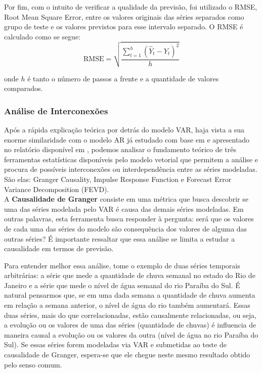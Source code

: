 \documentclass[12pt]{article}
\begin{document}
	Por fim, com o intuito de verificar a qualidade da previsão, foi utilizado o RMSE, \textrm{Root Mean Square Error}, entre os valores originais das séries separados como grupo de teste e os valores previstos para esse intervalo separado. O RMSE é calculado como se segue:
	\begin{equation}\label{eq:RMSE}
		\textrm{RMSE} = \sqrt{\dfrac{\sum_{t=1}^{h}(\hat{Y}_t-Y_t)^2}{h}}
	\end{equation} 
	
	onde $h$ é tanto o número de passos a frente e a quantidade de valores comparados.
	
	\subsubsection{Análise de Interconexões} \label{sec:interconex}
	
	Após a rápida explicação teórica por detrás do modelo VAR, haja vista a sua enorme similaridade com o modelo AR já estudado com base em \cite{Tsay} e apresentado no relatório disponível em \cite{git}, podemos analisar o fundamento teórico de três ferramentas estatísticas disponíveis pelo modelo vetorial que permitem a análise e procura de possíveis interconexões ou interdependência entre as séries modeladas. São elas: \textrm{Granger Causality}, \textrm{Impulse Response Function} e \textrm{Forecast Error Variance Decomposition} (FEVD).\\
	
	A \textbf{Causalidade de Granger} consiste em uma métrica que busca descobrir se uma das séries modelada pelo VAR é causa das demais séries modeladas. Em outras palavras, esta ferramenta busca responder à pergunta: será que os valores de cada uma das séries do modelo são consequência dos valores de alguma das outras séries? É importante ressaltar que essa análise se limita a estudar a causalidade em termos de previsão.
	
	Para entender melhor essa análise, tome o exemplo de duas séries temporais arbitrárias: a série que mede a quantidade de chuva semanal no estado do Rio de Janeiro e a série que mede o nível de água semanal do rio Paraíba do Sul. É natural pensarmos que, se em uma dada semana a quantidade de chuva aumenta em relação a semana anterior, o nível de água do rio também aumentará. Essas duas séries, mais do que correlacionadas, estão causalmente relacionadas, ou seja, a evolução ou os valores de uma das séries (quantidade de chuvas) é influencia de maneira causal a evolução ou os valores da outra (nível de água no rio Paraíba do Sul). Se essas séries forem modeladas via VAR e submetidas ao teste de causalidade de Granger, espera-se que ele chegue neste mesmo resultado obtido pelo senso comum.
	
\end{document}
